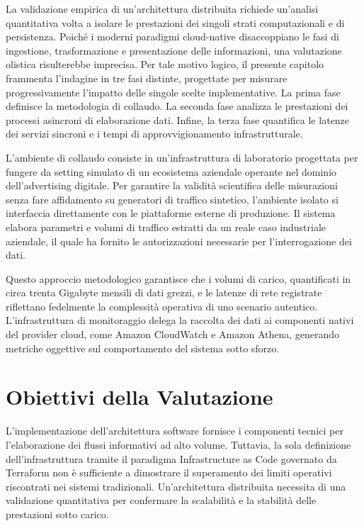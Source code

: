 La validazione empirica di un'architettura distribuita richiede un'analisi quantitativa volta a isolare le prestazioni dei singoli strati computazionali e di persistenza. Poiché i moderni paradigmi cloud-native disaccoppiano le fasi di ingestione, trasformazione e presentazione delle informazioni, una valutazione olistica risulterebbe imprecisa. Per tale motivo logico, il presente capitolo frammenta l'indagine in tre fasi distinte, progettate per misurare progressivamente l'impatto delle singole scelte implementative. La prima fase definisce la metodologia di collaudo. La seconda fase analizza le prestazioni dei processi asincroni di elaborazione dati. Infine, la terza fase quantifica le latenze dei servizi sincroni e i tempi di approvvigionamento infrastrutturale.

L'ambiente di collaudo consiste in un'infrastruttura di laboratorio progettata per fungere da setting simulato di un ecosistema aziendale operante nel dominio dell'advertising digitale. Per garantire la validità scientifica delle misurazioni senza fare affidamento su generatori di traffico sintetico, l'ambiente isolato si interfaccia direttamente con le piattaforme esterne di produzione. Il sistema elabora parametri e volumi di traffico estratti da un reale caso industriale aziendale, il quale ha fornito le autorizzazioni necessarie per l'interrogazione dei dati.

Questo approccio metodologico garantisce che i volumi di carico, quantificati in circa trenta Gigabyte mensili di dati grezzi, e le latenze di rete registrate riflettano fedelmente la complessità operativa di uno scenario autentico. L'infrastruttura di monitoraggio delega la raccolta dei dati ai componenti nativi del provider cloud, come Amazon CloudWatch e Amazon Athena, generando metriche oggettive sul comportamento del sistema sotto sforzo.

\section{Obiettivi della Valutazione}
L'implementazione dell'architettura software fornisce i componenti tecnici per l'elaborazione dei flussi informativi ad alto volume. Tuttavia, la sola definizione dell'infrastruttura tramite il paradigma Infrastructure as Code governato da Terraform non è sufficiente a dimostrare il superamento dei limiti operativi riscontrati nei sistemi tradizionali. Un'architettura distribuita necessita di una validazione quantitativa per confermare la scalabilità e la stabilità delle prestazioni sotto carico.

